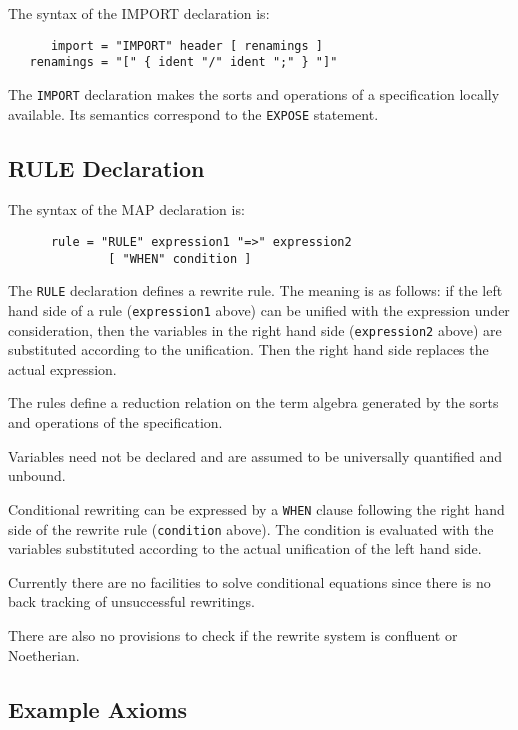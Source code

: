 The syntax of the IMPORT declaration is:
\begin{verbatim}
      import = "IMPORT" header [ renamings ]   
   renamings = "[" { ident "/" ident ";" } "]"
\end{verbatim}
The \verb/IMPORT/ declaration 
makes the sorts and operations of a specification 
locally available. Its semantics correspond to the 
\verb/EXPOSE/ statement.

\subsection{RULE Declaration}

The syntax of the MAP declaration is:
\begin{verbatim}
      rule = "RULE" expression1 "=>" expression2 
              [ "WHEN" condition ]
\end{verbatim}

The \verb/RULE/ declaration defines a rewrite rule.
The meaning is as follows:
if the left hand side of a rule (\verb/expression1/ above)
can be unified with the expression under consideration, 
then the variables in the right hand side 
(\verb/expression2/ above)
are substituted according to the unification. 
Then the right hand side replaces the actual expression.

The rules define a reduction relation on the term algebra 
generated by the sorts and operations of the specification. 

Variables need not be declared and are assumed 
to be universally quantified and unbound.

Conditional rewriting can be expressed by 
a \verb/WHEN/ clause following the right hand side of the  
rewrite rule (\verb/condition/ above).
The condition is evaluated with the variables 
substituted according to the actual unification of 
the left hand side. 

Currently there are no facilities to solve conditional 
equations since there is no back tracking of unsuccessful
rewritings.

There are also no provisions to check if the 
rewrite system is confluent or Noetherian.

\subsection{Example Axioms}

